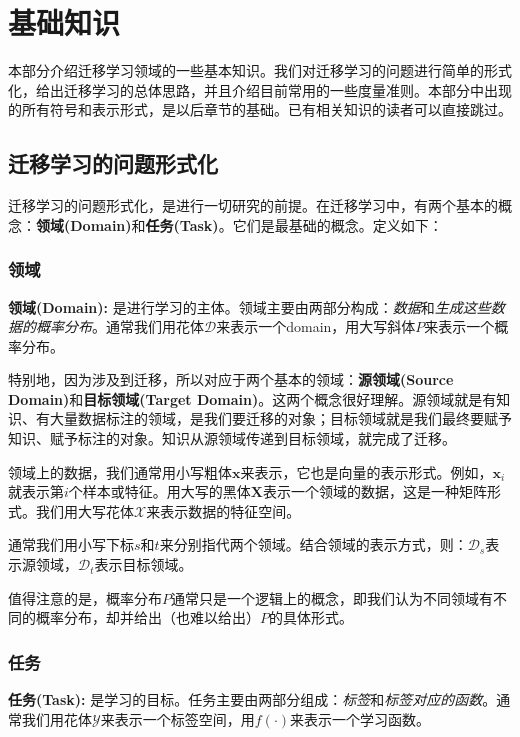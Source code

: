 \newpage
\section{基础知识}

本部分介绍迁移学习领域的一些基本知识。我们对迁移学习的问题进行简单的形式化，给出迁移学习的总体思路，并且介绍目前常用的一些度量准则。本部分中出现的所有符号和表示形式，是以后章节的基础。已有相关知识的读者可以直接跳过。

\subsection{迁移学习的问题形式化}

迁移学习的问题形式化，是进行一切研究的前提。在迁移学习中，有两个基本的概念：\textbf{领域(Domain)}和\textbf{任务(Task)}。它们是最基础的概念。定义如下：

\subsubsection{领域}

\textbf{领域(Domain):} 是进行学习的主体。领域主要由两部分构成：\textit{数据}和\textit{生成这些数据的概率分布}。通常我们用花体$\mathcal{D}$来表示一个domain，用大写斜体$P$来表示一个概率分布。

特别地，因为涉及到迁移，所以对应于两个基本的领域：\textbf{源领域(Source Domain)}和\textbf{目标领域(Target Domain)}。这两个概念很好理解。源领域就是有知识、有大量数据标注的领域，是我们要迁移的对象；目标领域就是我们最终要赋予知识、赋予标注的对象。知识从源领域传递到目标领域，就完成了迁移。

领域上的数据，我们通常用小写粗体$\mathbf{x}$来表示，它也是向量的表示形式。例如，$\mathbf{x}_i$就表示第$i$个样本或特征。用大写的黑体$\mathbf{X}$表示一个领域的数据，这是一种矩阵形式。我们用大写花体$\mathcal{X}$来表示数据的特征空间。

通常我们用小写下标$s$和$t$来分别指代两个领域。结合领域的表示方式，则：$\mathcal{D}_s$表示源领域，$\mathcal{D}_t$表示目标领域。

值得注意的是，概率分布$P$通常只是一个逻辑上的概念，即我们认为不同领域有不同的概率分布，却并给出（也难以给出）$P$的具体形式。

\subsubsection{任务}

\textbf{任务(Task):} 是学习的目标。任务主要由两部分组成：\textit{标签}和\textit{标签对应的函数}。通常我们用花体$\mathcal{Y}$来表示一个标签空间，用$f(\cdot)$来表示一个学习函数。

